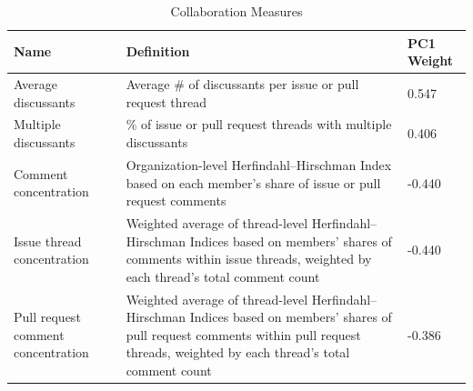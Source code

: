 \begin{longtable}{>{\raggedright\arraybackslash}p{} p{}p{}}
\caption{Collaboration Measures}\label{tab:collaboration_metrics}\\
\toprule
\textbf{Name} & \textbf{Definition} &\textbf{PC1 Weight} \\
\midrule
\endfirsthead

\bottomrule
\endlastfoot


Average discussants & Average \# of discussants per issue or pull request thread & 0.547 \\
Multiple discussants & \% of issue or pull request threads with multiple discussants & 0.406 \\
Comment concentration & Organization-level Herfindahl–Hirschman Index based on each member’s share of issue or pull request comments & -0.440 \\
Issue thread concentration & Weighted average of thread-level Herfindahl–Hirschman Indices based on members’ shares of comments within issue threads, weighted by each thread’s total comment count & -0.440 \\
Pull request comment concentration & Weighted average of thread-level Herfindahl–Hirschman Indices based on members’ shares of pull request comments within pull request threads, weighted by each thread’s total comment count & -0.386  \\

\end{longtable}


